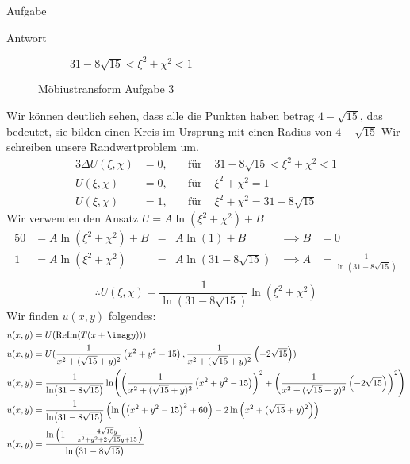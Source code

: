 \documentclass{scrartcl}
\begin{document}
\begin{section}{Aufgabe}
\begin{subsection}{Antwort}
\begin{figure}[H]
\begin{subfigure}{.47\textwidth}
  \caption{$ 31-8 \sqrt{15}<\xi^2+\chi^2<1$}
\end{subfigure}
\caption{Möbiustransform Aufgabe 3}
\end{figure}
    Wir können deutlich sehen, dass alle die Punkten haben betrag $4-\sqrt{15}$, das bedeutet, sie bilden einen Kreis im Ursprung mit einen Radius von $4-\sqrt{15}$
    Wir schreiben unsere Randwertproblem um.
    \begin{alignat*}{3}
        \Delta U(\xi,\chi)&=0, \quad &\text{für }& 31-8 \sqrt{15}<\xi^2+\chi^2<1\\
        U(\xi,\chi)&=0, \quad &\text{für }& \xi^2+\chi^2=1\\
        U(\xi,\chi)&=1, \quad &\text{für }& \xi^2+\chi^2=31-8 \sqrt{15}
    \end{alignat*}
    Wir verwenden den Ansatz $U=A\ln(\xi^2+\chi^2)+B$
    \begin{alignat*}{5}
        0&=A\ln(\xi^2+\chi^2)+B&=&A\ln(1)+B&\implies B&=0\\
        1&=A\ln(\xi^2+\chi^2)&=&A\ln(31-8 \sqrt{15})& \implies A&=\frac{1}{\ln(31-8 \sqrt{15})}\\
    \end{alignat*}
    \[\therefore U(\xi,\chi)=\frac{1}{\ln(31-8 \sqrt{15})}\ln(\xi^2+\chi^2)\]
    Wir finden $u(x,y)$ folgendes: 
    \begin{align*}
        u(x,y)&=U(\text{ReIm}(T(x+\imag y)))\\
        u(x,y)&=U(\frac{1}{x^2+(\sqrt{15}+y)^2}\left(x^2+y^2-15\right),\frac{1}{x^2+(\sqrt{15}+y)^2}\left(-2\sqrt{15}\right))\\
        u(x,y)&=\frac{1}{\ln(31-8 \sqrt{15})}\ln(\left(\frac{1}{x^2+(\sqrt{15}+y)^2}\left(x^2+y^2-15\right)\right)^2+\left(\frac{1}{x^2+(\sqrt{15}+y)^2}\left(-2\sqrt{15}\right)\right)^2)\\
        u(x,y)&=\frac{1}{\ln(31-8 \sqrt{15})}\left(\ln\left(\left(x^2+y^2-15\right)^2+60\right)-2\ln\left(x^2+(\sqrt{15}+y)^2\right)\right)\\
        u(x,y)&=\frac{\ln \left(1-\frac{4 \sqrt{15} y}{x^2+y^2+2 \sqrt{15} y+15}\right)}{\ln \left(31-8 \sqrt{15}\right)}
    \end{align*}
\end{subsection}
\end{section}    
\end{document}

